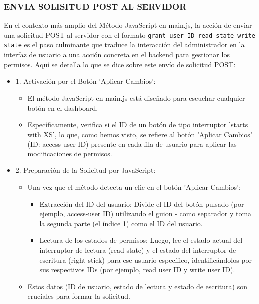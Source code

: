 \documentclass{report}
\begin{document}
\subsubsection{ENVIA SOLISITUD POST AL SERVIDOR}
En el contexto más amplio del Método JavaScript en main.js, la acción de enviar una solicitud POST al servidor con el formato 
\verb|grant-user ID-read state-write state| es el paso culminante que traduce la interacción del administrador en la interfaz de usuario a una 
acción concreta en el backend para gestionar los permisos.
Aquí se detalla lo que se dice sobre este envío de solicitud POST:
\begin{itemize}
    \item 1. Activación por el Botón 'Aplicar Cambios':
        \begin{itemize}
            \item El método JavaScript en main.js está diseñado para escuchar cualquier botón en el dashboard.
            \item Específicamente, verifica si el ID de un botón de tipo interruptor 'starts with XS', lo que, como hemos visto, se 
            refiere al botón 'Aplicar Cambios' (ID: access user ID) presente en cada fila de usuario para aplicar las modificaciones de permisos.
        \end{itemize}
    \item 2. Preparación de la Solicitud por JavaScript:
        \begin{itemize}
            \item Una vez que el método detecta un clic en el botón 'Aplicar Cambios':
            \begin{itemize}
                \item Extracción del ID del usuario: Divide el ID del botón pulsado (por ejemplo, access-user ID) utilizando el 
                guion - como separador y toma la segunda parte (el índice 1) como el ID del usuario.
                \item Lectura de los estados de permisos: Luego, lee el estado actual del interruptor de lectura (read state) y el 
                estado del interruptor de escritura (right stick) para ese usuario específico, identificándolos por sus respectivos 
                IDs (por ejemplo, read user ID y write user ID).
            \end{itemize}
            \item Estos datos (ID de usuario, estado de lectura y estado de escritura) son cruciales para formar la solicitud.

\end{itemize}
\end{itemize}
\end{document}
